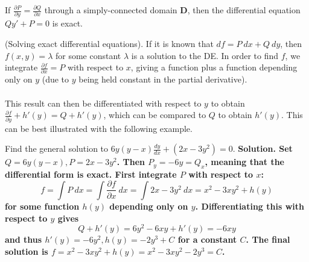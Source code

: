 \documentclass{article}
\begin{document}
\begin{theorem}
    If $\frac{\partial P}{\partial y} = \frac{\partial Q}{\partial x}$ through a simply-connected domain $\mathbf{D}$, then the differential equation $Qy' + P = 0$ is exact.
\end{theorem}
\begin{method}
    (Solving exact differential equations). If it is known that $df = P\ dx + Q\ dy$, then $f(x,y) = \lambda$ for some constant $\lambda$ is a solution to the DE. In order to find $f$, we integrate $\frac{\partial f}{\partial x} = P$ with respect to $x$, giving a function plus a function depending only on $y$ (due to $y$ being held constant in the partial derivative). \\ \\This result can then be differentiated with respect to $y$ to obtain $\frac{\partial f}{\partial y} + h'(y) = Q + h'(y)$, which can be compared to $Q$ to obtain $h'(y)$. This can be best illustrated with the following example.
\end{method}
\begin{example}
    Find the general solution to $6y(y-x)\frac{dy}{dx} + (2x-3y^2) = 0$.
    \bf Solution. \normalfont Set $Q = 6y(y-x), P= 2x-3y^2$. Then $P_y = -6y = Q_x$, meaning that the differential form is exact. First integrate $P$ with respect to $x$:
    \begin{equation*}
        f = \int P \ dx = \int \frac{\partial f}{\partial x} \ dx  = \int 2x-3y^2 \ dx =x^2 - 3xy^2 + h(y)
    \end{equation*}
    for some function $h(y)$ depending only on $y$. Differentiating this with respect to $y$ gives
    \begin{equation*}
        Q + h'(y) =6y^2 - 6xy + h'(y) =  -6xy
    \end{equation*}
    and thus $h'(y) = -6y^2, h(y) = -2y^3 + C$ for a constant $C$. The final solution is $f = x^2 - 3xy^2 + h(y) = x^2 - 3xy^2 - 2y^3 = C$.

\end{example}
\end{document}
